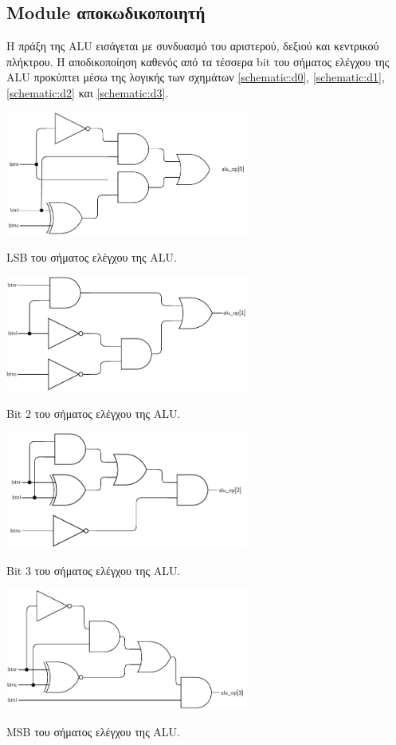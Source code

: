 \subsection{Module αποκωδικοποιητή}
Η πράξη της ALU εισάγεται με συνδυασμό του αριστερού, δεξιού και κεντρικού πλήκτρου. Η αποδικοποίηση καθενός από τα τέσσερα bit του σήματος ελέγχου της ALU προκύπτει μέσω της λογικής των σχημάτων \ref{schematic:d0}, \ref{schematic:d1}, \ref{schematic:d2} και \ref{schematic:d3}.
\begin{circuitfig}[H]
	\centering
	\includegraphics[width=8cm]{schematics/d0.pdf}
	\caption{LSB του σήματος ελέγχου της ALU.}
	\label{schematic:d0}
\end{circuitfig}
\begin{circuitfig}[H]
	\centering
	\includegraphics[width=8cm]{schematics/d1.pdf}
	\caption{Bit 2 του σήματος ελέγχου της ALU.}
	\label{schematic:d1}
\end{circuitfig}
\begin{circuitfig}[H]
	\centering
	\includegraphics[width=8cm]{schematics/d2.pdf}
	\caption{Bit 3 του σήματος ελέγχου της ALU.}
	\label{schematic:d2}
\end{circuitfig}
\begin{circuitfig}[H]
	\centering
	\includegraphics[width=8cm]{schematics/d3.pdf}
	\caption{MSB του σήματος ελέγχου της ALU.}
	\label{schematic:d3}
\end{circuitfig}


